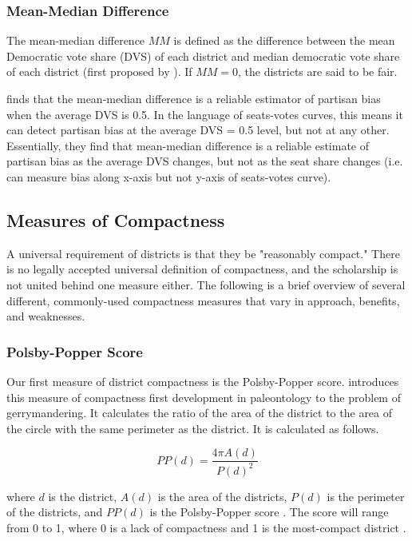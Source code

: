 \subsubsection{Mean-Median Difference}

The mean-median difference $MM$ is defined as the difference between the mean Democratic vote share (DVS) of each district and median democratic vote share of each district (first proposed by \textcite{mcdonald2015}). If $MM = 0$, the districts are said to be fair. 

\textcite{katz2020} finds that the mean-median difference is a reliable estimator of partisan bias when the average DVS is 0.5. In the language of seats-votes curves, this means it can detect partisan bias at the average DVS = 0.5 level, but not at any other. Essentially, they find that mean-median difference is a reliable estimate of partisan bias as the average DVS changes, but not as the seat share changes (i.e. can measure bias along x-axis but not y-axis of seats-votes curve). \parencite[27-9]{katz2020}

\subsection{Measures of Compactness}

A universal requirement of districts is that they be "reasonably compact." There is no legally accepted universal definition of compactness, and the scholarship is not united behind one measure either. The following is a brief overview of several different, commonly-used compactness measures that vary in approach, benefits, and weaknesses. 

\subsubsection{Polsby-Popper Score}

Our first measure of district compactness is the Polsby-Popper score. \textcite{polsby1991} introduces this measure of compactness first development in paleontology to the problem of gerrymandering. It calculates the ratio of the area of the district to the area of the circle with the same perimeter as the district. It is calculated as follows.

\begin{equation}
    PP(d) = \frac{4 \pi A(d)}{P(d)^2}
\end{equation}

where $d$ is the district, $A(d)$ is the area of the districts, $P(d)$ is the perimeter of the districts, and $PP(d)$ is the Polsby-Popper score \parencite{cox1927,polsby1991}. The score will range from 0 to 1, where 0 is a lack of compactness and 1 is the most-compact district \parencite{polsby1991}.

